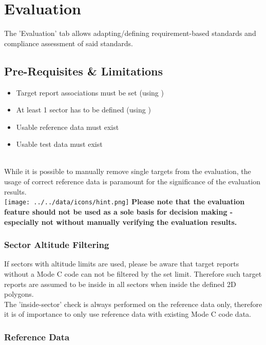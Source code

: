 \chapter{Evaluation}
\label{sec:eval} 

The 'Evaluation' tab allows adapting/defining requirement-based standards and compliance assessment of said standards. \\

\section{Pre-Requisites \& Limitations}
\label{sec:eval_prereq} 

\begin{itemize}  
\item Target report associations must be set (using )
\item At least 1 sector has to be defined (using )
\item Usable reference data must exist
\item Usable test data must exist
\end{itemize}
\ \\

While it is possible to manually remove single targets from the evaluation, the usage of correct reference data is paramount for the significance of the evaluation results. \\

\texttt{[image: ../../data/icons/hint.png]} \textbf{Please note that the evaluation feature should not be used as a sole basis for decision making - especially not without manually verifying the evaluation results.}

\subsection{Sector Altitude Filtering}

If sectors with altitude limits are used, please be aware that target reports without a Mode C code can not be filtered by the set limit. Therefore such target reports are assumed to be inside in all 
sectors when inside the defined 2D polygons. \\

The 'inside-sector' check is always performed on the reference data only, therefore it is of importance to only use reference data with existing Mode C code data.

\subsection{Reference Data}

